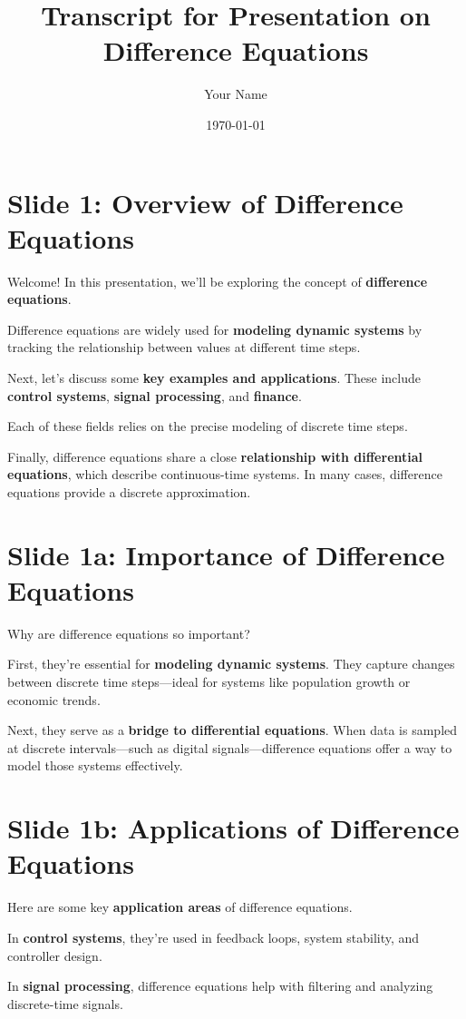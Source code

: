 \documentclass[12pt]{article}
\title{Transcript for Presentation on Difference Equations}
\author{Your Name}
\date{\today}
\begin{document}
\maketitle

\section*{Slide 1: Overview of Difference Equations}
Welcome! In this presentation, we’ll be exploring the concept of \textbf{difference equations}. 

Difference equations are widely used for \textbf{modeling dynamic systems} by tracking the relationship between values at different time steps.

Next, let’s discuss some \textbf{key examples and applications}. These include \textbf{control systems}, \textbf{signal processing}, and \textbf{finance}.

Each of these fields relies on the precise modeling of discrete time steps.

Finally, difference equations share a close \textbf{relationship with differential equations}, which describe continuous-time systems. In many cases, difference equations provide a discrete approximation.

\section*{Slide 1a: Importance of Difference Equations}
Why are difference equations so important?

First, they’re essential for \textbf{modeling dynamic systems}. They capture changes between discrete time steps—ideal for systems like population growth or economic trends.

Next, they serve as a \textbf{bridge to differential equations}. When data is sampled at discrete intervals—such as digital signals—difference equations offer a way to model those systems effectively.

\section*{Slide 1b: Applications of Difference Equations}
Here are some key \textbf{application areas} of difference equations.

In \textbf{control systems}, they’re used in feedback loops, system stability, and controller design.

In \textbf{signal processing}, difference equations help with filtering and analyzing discrete-time signals.
\end{document}
